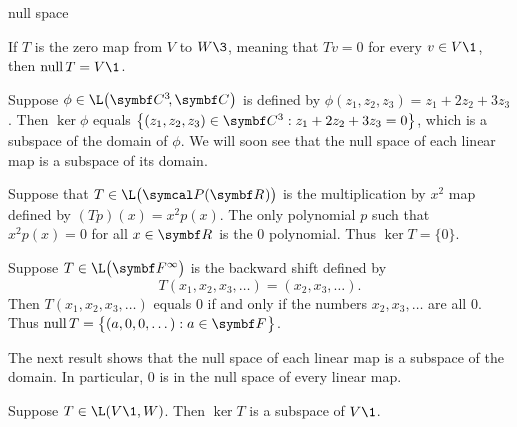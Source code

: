 \begin{example}[null]{null space}

\begin{Itemize}
\item
If $T$ is the zero map from $V$ to $W\3$, meaning that $Tv = 0$ for every $v \in V\1$, then $\ker T = V\1$.
\item
Suppose $\phi \in \L\paren[\big]{\CC3, \C{}}$ is defined by $\phi(z_1, z_2, z_3) = z_1 + 2z_2 + 3z_3$. Then
$\ker \phi$ equals $\br[\big]{(z_1, z_2, z_3) \in \C3: z_1 + 2z_2 + 3z_3 = 0}$, which is a subspace of the domain of $\phi$. We will soon see that the null space of each linear map is a subspace of its domain.
\item
{}
\item
Suppose that $T\in \L\bigl(\P(\R{})\bigr)$ is the multiplication by $x^2$ map defined
by $(Tp)(x) = x^2 p(x)$. The only polynomial $p$ such that $x^2 p(x) = 0$
for all $x \in \R{}$ is the $0$ polynomial.  Thus $
\ker T = \{ 0 \}$.
\item
Suppose $T\in \L\paren[\big]{\F{\infty}}$ is the backward shift defined by
\[
T(x_1, x_2, x_3, \dots) = (x_2, x_3, \dots).
\]
Then $T(x_1, x_2, x_3, \dots)$ equals $0$ if and only if
the numbers $x_2, x_3, \dots$ are all $0$.  Thus
$
\ker T = \br[\big]{ (a, 0, 0, \dots): a \in \F{} }$.
\end{Itemize}
\exampleitemend
\end{example}

The next result shows that the null space of each linear map is a subspace of
the domain.  In particular, $0$ is in the null space of every linear map.

%
{Suppose $T \in \L(V\1,W)$. Then\/ $\ker T$ is a subspace of\/ $V\1$.
}


